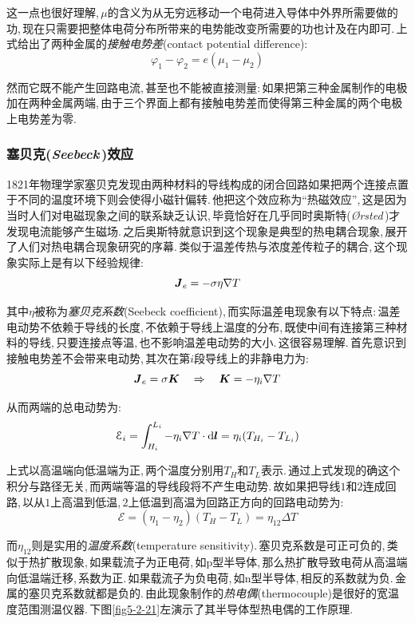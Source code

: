 这一点也很好理解,\,\(\mu\)的含义为从无穷远移动一个电荷进入导体中外界所需要做的功,\,现在只需要把整体电荷分布所带来的电势能改变所需要的功也计及在内即可.\,上式给出了两种金属的\emph{接触电势差}(contact potential difference):
\[\varphi_1-\varphi_2=e(\mu_1-\mu_2)\]

然而它既不能产生回路电流,\,甚至也不能被直接测量:\,如果把第三种金属制作的电极加在两种金属两端,\,由于三个界面上都有接触电势差而使得第三种金属的两个电极上电势差为零.

\subsubsection{\hei 塞贝克({\it Seebeck\,})效应}
1821年物理学家塞贝克发现由两种材料的导线构成的闭合回路如果把两个连接点置于不同的温度环境下则会使得小磁针偏转.\,他把这个效应称为``热磁效应'',\,这是因为当时人们对电磁现象之间的联系缺乏认识,\,毕竟恰好在几乎同时奥斯特({\it \O rsted\,})才发现电流能够产生磁场.\,之后奥斯特就意识到这个现象是典型的热电耦合现象,\,展开了人们对热电耦合现象研究的序幕.\,类似于温差传热与浓度差传粒子的耦合,\,这个现象实际上是有以下经验规律:
\[\boldsymbol{J}_e=-\sigma \eta\nabla T\]

其中\(\eta\)被称为\emph{塞贝克系数}(Seebeck coefficient),\,而实际温差电现象有以下特点:\,温差电动势不依赖于导线的长度,\,不依赖于导线上温度的分布,\,既使中间有连接第三种材料的导线,\,只要连接点等温,\,也不影响温差电动势的大小.\,这很容易理解.\,首先意识到接触电势差不会带来电动势,\,其次在第\(i\)段导线上的非静电力为:
\[\boldsymbol{J}_e=\sigma \boldsymbol{K}\quad \Rightarrow \quad \boldsymbol{K}=-\eta_i\nabla T\]

从而两端的总电动势为:
\[\mathcal{E}_i=\int_{H_i}^{L_i} -\eta_i \nabla T\cdot\textrm{d} \boldsymbol{l}=\eta_i(T_{H_i}-T_{L_i})\]

上式以高温端向低温端为正,\,两个温度分别用\(T_H\)和\(T_L\)表示.\,通过上式发现的确这个积分与路径无关,\,而两端等温的导线段将不产生电动势.\,故如果把导线\(1\)和\(2\)连成回路,\,以从\(1\)上高温到低温,\,\(2\)上低温到高温为回路正方向的回路电动势为:
\[\mathcal{E}=(\eta_1-\eta_2)(T_H-T_L)=\eta_{12}\Delta T\]

而\(\eta_{12}\)则是实用的\emph{温度系数}(temperature sensitivity).\,塞贝克系数是可正可负的,\,类似于热扩散现象,\,如果载流子为正电荷,\,如\(\mathrm{p}\)型半导体,\,那么热扩散导致电荷从高温端向低温端迁移,\,系数为正.\,如果载流子为负电荷,\,如\(\mathrm{n}\)型半导体,\,相反的系数就为负.\,金属的塞贝克系数就都是负的.\,由此现象制作的\emph{热电偶}(thermocouple)是很好的宽温度范围测温仪器.\,下图\ref{fig5-2-21}左演示了其半导体型热电偶的工作原理.

